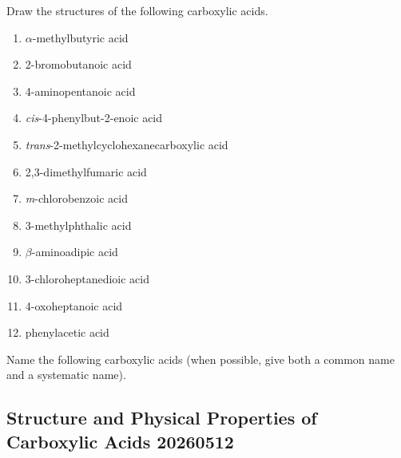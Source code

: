 \begin{example} %
    Draw the structures of the following carboxylic acids.
    \begin{enumerate}[label=(\alph*)]
        \item $\alpha$-methylbutyric acid
        \item 2-bromobutanoic acid
        \item 4-aminopentanoic acid
        \item \textit{cis}-4-phenylbut-2-enoic acid
        \item \textit{trans}-2-methylcyclohexanecarboxylic acid
        \item 2,3-dimethylfumaric acid 
        \item \textit{m}-chlorobenzoic acid
        \item 3-methylphthalic acid
        \item $\beta$-aminoadipic acid
        \item 3-chloroheptanedioic acid
        \item 4-oxoheptanoic acid
        \item phenylacetic acid
    \end{enumerate}
\end{example}

\begin{example} %
    Name the following carboxylic acids (when possible, give both a common name and a systematic name).
\end{example}

\subsection{Structure and Physical Properties of Carboxylic Acids 20260512}

